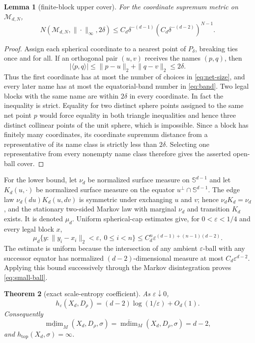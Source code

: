 \documentclass[11pt,a4paper]{amsart}
\newtheorem{theorem}{Theorem}[section]
\newtheorem{lemma}[theorem]{Lemma}
\theoremstyle{definition}
\theoremstyle{remark}
\newcommand{\Sphere}{\mathbb S}
\newcommand{\mdim}{\operatorname{mdim}}
\begin{document}
\begin{lemma}[finite-block upper cover]\label{lem:upper-block}
For the coordinate supremum metric on $\mathcal M_{d,N}$,
\[
 N(\mathcal M_{d,N},\|\cdot\|_\infty,2\delta)
 \leq C_d\delta^{-(d-1)}
       \left(C_d\delta^{-(d-2)}\right)^{N-1}.
\]
\end{lemma}

\begin{proof}
Assign each spherical coordinate to a nearest point of $P_\delta$, breaking
ties once and for all.  If an orthogonal pair $(u,v)$ receives the names
$(p,q)$, then
\[
 |\langle p,q\rangle|
 \leq\|p-u\|_2+\|q-v\|_2\leq2\delta.
\]
Thus the first coordinate has at most the number of choices in
\eqref{eq:net-size}, and every later name has at most the equatorial-band
number in \eqref{eq:band}.  Two legal blocks with the same name are within
$2\delta$ in every coordinate.  In fact the inequality is strict.  Equality
for two distinct sphere points assigned to the same net point $p$ would
force equality in both triangle inequalities and hence three distinct
collinear points of the unit sphere, which is impossible.  Since a block has
finitely many coordinates, its coordinate supremum distance from a
representative of its name class is strictly less than $2\delta$.
Selecting one representative from every nonempty name class therefore gives
the asserted open-ball cover.
\end{proof}

For the lower bound, let $\nu_d$ be normalized surface measure on
$\Sphere^{d-1}$ and let $K_d(u,\cdot)$ be normalized surface measure on the
equator $u^\perp\cap\Sphere^{d-1}$.  The edge law
$\nu_d(du)K_d(u,dv)$ is symmetric under exchanging $u$ and $v$; hence
$\nu_dK_d=\nu_d$, and the stationary two-sided Markov law with marginal
$\nu_d$ and transition $K_d$ exists.  It is denoted $\mu_d$.  Uniform
spherical-cap estimates give, for $0<\varepsilon<1/4$ and every legal block
$x$,
\begin{equation}\label{eq:small-ball}
 \mu_d\{y:\|y_i-x_i\|_2<\varepsilon,\ 0\leq i<n\}
 \leq C_d^n\varepsilon^{(d-1)+(n-1)(d-2)}.
\end{equation}
The estimate is uniform because the intersection of any ambient
$\varepsilon$-ball with any successor equator has normalized
$(d-2)$-dimensional measure at most $C_d\varepsilon^{d-2}$.  Applying this
bound successively through the Markov disintegration proves
\eqref{eq:small-ball}.

\begin{theorem}[exact scale-entropy coefficient]\label{thm:scale}
As $\varepsilon\downarrow0$,
\[
 h_\varepsilon(X_d,D_\rho)
 =(d-2)\log(1/\varepsilon)+O_d(1).
\]
Consequently
\[
 \underline{\mdim}_{M}(X_d,D_\rho,\sigma)
 =\overline{\mdim}_{M}(X_d,D_\rho,\sigma)=d-2,
\]
and $h_{\mathrm{top}}(X_d,\sigma)=\infty$.
\end{theorem}
\end{document}
